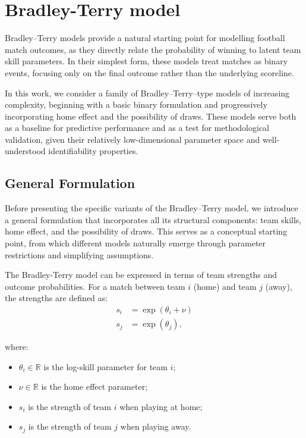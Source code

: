 \section{Bradley-Terry model}
\label{sec:BTmodel}

Bradley–Terry models \cite{bradley_terry_1952} provide a natural starting point for modelling football match outcomes, as they directly relate the probability of winning to latent team skill parameters.
In their simplest form, these models treat matches as binary events, focusing only on the final outcome rather than the underlying scoreline.

In this work, we consider a family of Bradley–Terry–type models of increasing complexity, beginning with a basic binary formulation and progressively incorporating home effect and the possibility of draws.
These models serve both as a baseline for predictive performance and as a test for methodological validation, given their relatively low-dimensional parameter space and well-understood identifiability properties.

\subsection{General Formulation}
\label{sec:BT_general_formulation}

Before presenting the specific variants of the Bradley–Terry model, we introduce a general formulation that incorporates all its structural components: team skills, home effect, and the possibility of draws.
This serves as a conceptual starting point, from which different models naturally emerge through parameter restrictions and simplifying assumptions.

The Bradley-Terry model can be expressed in terms of team strengths and outcome probabilities.
For a match between team $i$ (home) and team $j$ (away), the strengths are defined as:
\begin{align}
    \label{eq:bt_general_home_strength}
    s_i &= \exp(\theta_i + \nu) \\
    \label{eq:bt_general_away_strength}
    s_j &= \exp(\theta_j),
\end{align}

\noindent where:
\begin{itemize}
    \item $\theta_i \in \mathbb{R}$ is the log-skill parameter for team $i$;
    \item $\nu \in \mathbb{R}$ is the home effect parameter;
    \item $s_i$ is the strength of team $i$ when playing at home;
    \item $s_j$ is the strength of team $j$ when playing away.
\end{itemize}


